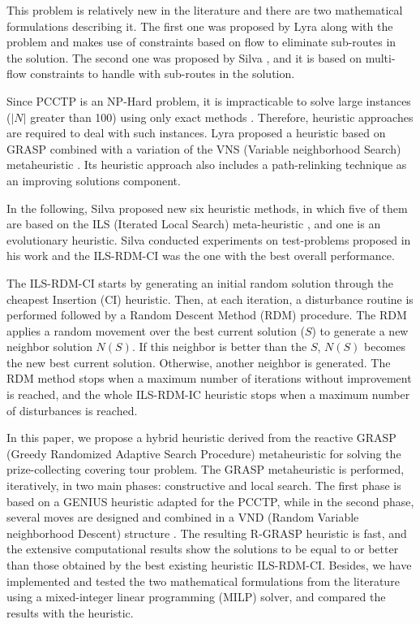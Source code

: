 \documentclass{ro}
\begin{document}
This problem is relatively new in the literature and there are two mathematical formulations describing it. The first one was proposed by Lyra \cite{lyra2004problema} along with the problem and makes use of constraints based on flow to eliminate sub-routes in the solution. The second one was proposed by  Silva \cite{silva2009problema}, and it is based on multi-flow constraints to
handle with sub-routes in the solution.


Since PCCTP is an NP-Hard problem, it is impracticable to solve large instances ($|N|$ greater than 100) using only exact methods \cite{lyra2004problema}. Therefore, heuristic approaches are required to deal with such instances. Lyra \cite{lyra2004problema} proposed a heuristic based on GRASP combined with a variation of the VNS (Variable neighborhood Search) metaheuristic \cite{mladenovic97}. Its heuristic approach also includes a path-relinking technique as an improving solutions component.

In the following,  Silva \cite{silva2009problema} proposed new six heuristic methods, in which five of them are based on the ILS (Iterated Local Search)  meta-heuristic \cite{lourencco2003iterated}, and one is an evolutionary heuristic. Silva \cite{silva2009problema} conducted experiments on test-problems proposed in his work and the ILS-RDM-CI was the one with the best overall performance. 

The ILS-RDM-CI starts by generating an initial random solution through the cheapest Insertion (CI)  heuristic. Then, at each iteration, a disturbance routine is performed followed by a Random Descent Method (RDM) procedure. The RDM applies a random movement over the best current solution ($S$) to generate a new neighbor solution $N(S)$. If this neighbor is better than the $S$, $N(S)$ becomes the new best current solution. Otherwise, another neighbor is generated. The RDM method stops when a maximum number of iterations without improvement is reached, and the whole ILS-RDM-IC heuristic stops when a maximum number of disturbances is reached.


In this paper, we propose a hybrid heuristic derived from the reactive GRASP (Greedy Randomized Adaptive Search Procedure) metaheuristic \cite{grasp03}  for solving the prize-collecting covering tour problem. The GRASP metaheuristic is performed, iteratively, in two main phases: constructive and local search. The first phase is based on a GENIUS heuristic \cite{genius} adapted for the PCCTP, while in the second phase, several moves are designed and combined in a VND (Random Variable neighborhood Descent) structure \cite{mladenovic97}. The resulting R-GRASP heuristic is fast, and the extensive computational results show the solutions to be equal to or better than those obtained by the best existing heuristic ILS-RDM-CI. Besides, we have implemented and tested the two mathematical formulations from the literature  using a mixed-integer linear programming (MILP) solver, and compared the results with the heuristic.
\end{document}
